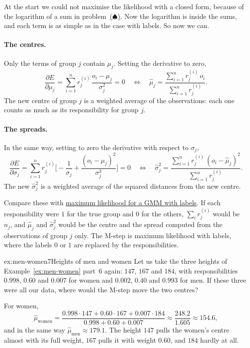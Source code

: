 \documentclass[a4paper,12pt,oneside]{report}
\newcommand{\spadeproblem}{\hyperref[box:spade]{($\spadesuit$)}}
\begin{document}
At the start we could not maximise the likelihood with a closed form,
because of the logarithm of a sum in problem~\spadeproblem. Now the
logarithm is inside the sums, and each term is as simple as in the case
with labels. So now we can.

\paragraph{The centres.} Only the terms of group $j$ contain $\mu_j$. Setting
the derivative to zero,
\[
\frac{\partial E}{\partial\mu_j}=\sum_{i=1}^n r_j^{(i)}\,
\frac{o_i-\mu_j}{\sigma_j^2}=0
\quad\Longleftrightarrow\quad
\hat\mu_j=\frac{\sum_{i=1}^n r_j^{(i)}\,o_i}{\sum_{i=1}^n r_j^{(i)}}.
\]
The new centre of group $j$ is a weighted average of the observations: each
one counts as much as its responsibility for group $j$.

\paragraph{The spreads.} In the same way, setting to zero the derivative
with respect to $\sigma_j$,
\[
\frac{\partial E}{\partial\sigma_j}=\sum_{i=1}^n r_j^{(i)}
\Big[-\frac{1}{\sigma_j}+\frac{(o_i-\mu_j)^2}{\sigma_j^3}\Big]=0
\quad\Longleftrightarrow\quad
\hat\sigma_j^2=\frac{\sum_{i=1}^n r_j^{(i)}\,(o_i-\hat\mu_j)^2}
{\sum_{i=1}^n r_j^{(i)}}.
\]
The new $\hat\sigma_j^2$ is a weighted average of the squared distances from
the new centre.

Compare these with \hyperref[prop:mle-gmm-labels]{maximum likelihood for a
GMM with labels}. If each responsibility were $1$ for the true group and $0$
for the others, $\sum_i r_j^{(i)}$ would be $n_j$, and $\hat\mu_j$ and
$\hat\sigma_j^2$ would be the centre and the spread computed from the
observations of group $j$ only. The M-step is maximum likelihood with labels, where the
labels $0$ or $1$ are replaced by the responsibilities.

\begin{framedexamplepart}{ex:men-women}{7}{Heights of men and women}
Let us take the three heights of Example~\ref{ex:men-women} part~6 again:
$147$, $167$ and $184$, with responsibilities $0.998$, $0.60$ and $0.007$
for women and $0.002$, $0.40$ and $0.993$ for men. If these three were all
our data, where would the M-step move the two centres?

For women,
\[
\hat\mu_{\text{women}}
=\frac{0.998\cdot147+0.60\cdot167+0.007\cdot184}{0.998+0.60+0.007}
\approx\frac{248.2}{1.605}\approx154.6,
\]
and in the same way $\hat\mu_{\text{men}}\approx179.1$. The height $147$ pulls
the women's centre almost with its full weight, $167$ pulls it with weight
$0.60$, and $184$ hardly at all.
\end{framedexamplepart}
\end{document}
